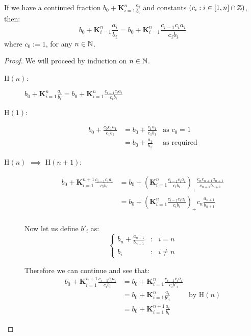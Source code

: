 \begin{equiv cont frac}
\label{THM_"equiv cont frac}
If we have a continued fraction \(b_0 + \mathbf{K}_{i=1}^n\frac{a_i}{b_i}\) and constants \((c_i : i \in [1, n] \cap \mathbb{Z})\), then:
\[b_0 + \mathbf{K}_{i=1}^n\frac{a_i}{b_i} = b_0 + \mathbf{K}_{i=1}^n\frac{c_{i-1}c_ia_i}{c_ib_i}\]
where \(c_0 := 1\), for any \(n \in \mathbb{N}\).
\end{equiv cont frac}
\begin{proof}
We will proceed by induction on \(n \in \mathbb{N}\).\\
\begin{description}
\item[\textrm{H\((n)\):}] \(b_0 + \mathbf{K}_{i=1}^n\frac{a_i}{b_i} = b_0 + \mathbf{K}_{i=1}^n\frac{c_{i-1}c_ia_i}{c_ib_i}\)
\item[\textrm{H\((1)\):}]
	\begin{align*}
		b_0 + \frac{c_0c_1a_1}{c_1b_1} 
			&= b_0 + \frac{c_1a_1}{c_1b_1} &\textrm{as \(c_0 = 1\)}\\
			&= b_0 + \frac{a_1}{b_1} &\textrm{as required}
	\end{align*}
\item[\textrm{H\((n)\) \(\implies\) H\((n+1)\):}]
	\begin{align*}
		b_0 + \mathbf{K}_{i=1}^{n+1}\frac{c_{i-1}c_ia_i}{c_ib_i}
			&= b_0 + \left(\mathbf{K}_{i=1}^n
				\frac{c_{i-1}c_ia_i}{c_ib_i}\right)_+
				\frac{c_nc_{n+1}a_{n+1}}{c_{n+1}b_{n+1}}\\
			&= b_0 + \left(\mathbf{K}_{i=1}^n
				\frac{c_{i-1}c_ia_i}{c_ib_i}\right)_+
				c_n\frac{a_{n+1}}{b_{n+1}}\\
	\end{align*}

Now let us define \(b'_i\) as:
\begin{displaymath}
\left\{
	\begin{array}{lcl}
		b_n + \frac{a_{n+1}}{b_{n+1}} &:& i = n\\
		b_i &:& i \neq n
	\end{array}
\right.
\end{displaymath}

Therefore we can continue and see that:
	\begin{align*}
		b_0 + \mathbf{K}_{i=1}^{n+1}\frac{c_{i-1}c_ia_i}{c_ib_i}
			&= b_0 + \mathbf{K}_{i=1}^n\frac{c_{i-1}c_ia_i}{c_ib'_i}\\
			&= b_0 + \mathbf{K}_{i=1}^n \frac{a_i}{b'_i}
				&\textrm{by H\((n)\)}\\
			&= b_0 + \mathbf{K}_{i=1}^{n+1}\frac{a_i}{b_i}
	\end{align*}
\end{description}
\end{proof}

